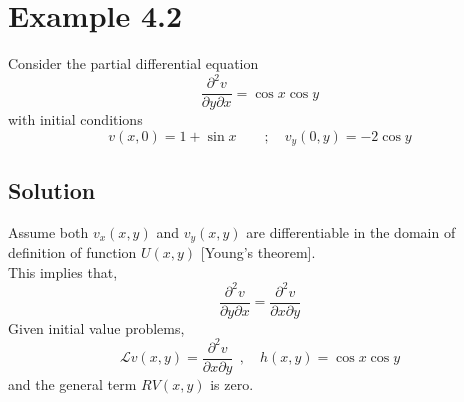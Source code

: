 \documentclass[11pt]{report}
\newcommand{\Laplace}{\mathcal{L}}
\newcommand{\sps}{\\[0.2cm]}
\begin{document}
	\section*{Example 4.2}
	Consider the partial differential equation
	\begin{equation*}
		\frac{\partial^2 v}{\partial y\partial x} = \cos x \cos y\label{p:4_2_1}
	\end{equation*}
	with initial conditions
	\begin{equation*}
		v(x,0)=1+\sin x \qquad ; \quad v_y(0,y)=-2\cos y  \label{p:4_2_2}
	\end{equation*}
	
	\subsection*{Solution}
	Assume both $v_x(x,y)$ and $v_y(x,y)$ are differentiable in the domain of definition of function $U(x,y)$ [Young's theorem].\sps
	This implies that,
	\begin{equation*}
		\frac{\partial^2 v}{\partial y \partial x}= \frac{\partial^2 v}{\partial x \partial y}
	\end{equation*}
	Given initial value problems,
	\begin{equation*}
		\Laplace v(x,y) = \frac{\partial^2 v}{\partial x\partial y}~~ , \quad h(x,y) =\cos x \cos y
	\end{equation*}
	and the general term $RV(x,y)$ is zero.\\
	
\end{document}
